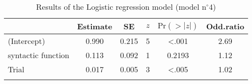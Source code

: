 \begin{table}
\begin{tabular}{l S[table-format=1.3] S[table-format=1.3] S[table-format=1] S[table-format=<1.4] S[table-format=1.2]}
  \lsptoprule
 & {Estimate} & {SE} & {$z$} & {$\text{Pr}(>|z|)$} & {Odd.ratio} \\ 
  \midrule
(Intercept) & 0.990 & 0.215 & 5 & <.001 & 2.69 \\ 
  syntactic function & 0.113 & 0.092 & 1 & 0.2193 & 1.12 \\ 
  Trial & 0.017 & 0.005 & 3 & <.005 & 1.02 \\ 
   \lspbottomrule
\end{tabular}
\caption{Results of the Logistic regression model (model n$^{\circ}$4)}
\label{tab:exp02-m4}
\end{table}
